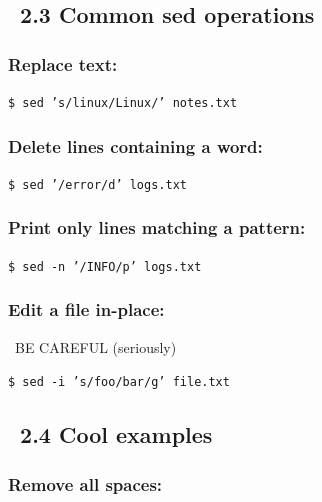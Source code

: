 \documentclass[12pt]{article}
\newcommand{\toolicon}{\faTools}
\newcommand{\bulbicon}{\faLightbulb}
\newcommand{\warningicon}{\faExclamationTriangle}
\begin{document}
\subsection*{\toolicon\ 2.3 Common sed operations}

\subsubsection*{Replace text:}

\begin{highlightbox}
\texttt{\$ sed 's/linux/Linux/' notes.txt}
\end{highlightbox}

\subsubsection*{Delete lines containing a word:}

\begin{highlightbox}
\texttt{\$ sed '/error/d' logs.txt}
\end{highlightbox}

\subsubsection*{Print only lines matching a pattern:}

\begin{highlightbox}
\texttt{\$ sed -n '/INFO/p' logs.txt}
\end{highlightbox}

\subsubsection*{Edit a file \textbf{in-place}:}

\begin{warningbox}
\warningicon\ BE CAREFUL (seriously)
\end{warningbox}

\begin{highlightbox}
\texttt{\$ sed -i 's/foo/bar/g' file.txt}
\end{highlightbox}

\subsection*{\bulbicon\ 2.4 Cool examples}

\subsubsection*{Remove all spaces:}
\end{document}
